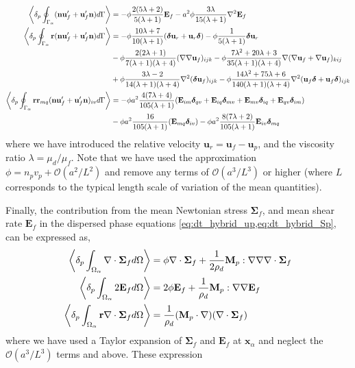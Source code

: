\begin{align}
    \pSavg{ (\textbf{n} \textbf{u}_f' + \textbf{u}_f' \textbf{n})}
    &=
    -  \phi \frac{2(5\lambda +2)}{5(\lambda+1)}\textbf{E}_f
    -  a^2 \phi \frac{3\lambda}{15(\lambda+1)}\grad^2  \textbf{E}_f
    \\
    \pSavg{ \textbf{r}(\textbf{n} \textbf{u}_f' + \textbf{u}_f' \textbf{n})}
    &=
    -\phi \frac{10\lambda +7}{10(\lambda+1)}
    (\bm\delta \textbf{u}_r + \textbf{u}_r \bm\delta)
    - \phi  \frac{1}{5(\lambda+1)}\bm\delta \textbf{u}_r\\
    &-  \phi \frac{2(2\lambda+1)}{7(\lambda+1)(\lambda+4)}(\grad\grad \textbf{u}_f)_{ijk}
    -  \phi \frac{7\lambda^2+20\lambda+3}{35(\lambda+1)(\lambda+4)}\grad(\grad \textbf{u}_f+\grad \textbf{u}_f)_{kij}\nonumber\\
    &+  \phi \frac{3\lambda-2}{14(\lambda+1)(\lambda+4)}\grad^2(\bm\delta\textbf{u}_f)_{ijk}
    -  \phi \frac{14\lambda^2+75\lambda+6}{140(\lambda+1)(\lambda+4)}\grad^2 (\textbf{u}_f \bm\delta + \textbf{u}_f \bm\delta)_{ijk}\nonumber
    \label{eq:secondUN}\\
    \pSavg{ \textbf{rr}_{mq}(\textbf{n} \textbf{u}_f' + \textbf{u}_f' \textbf{n})_{iv}}
    &=
    -\phi a^2 \frac{4(7\lambda+4)}{105(\lambda+1)}
    (\textbf{E}_{im} \bm\delta_{qv}
    +\textbf{E}_{iq}\bm\delta_{mv}
    + \textbf{E}_{mv} \bm\delta_{iq}
    + \textbf{E}_{qv}\bm\delta_{im}
    )
    \\
    &
    -\phi a^2 
    \frac{16}{105(\lambda+1)}(\textbf{E}_{mq}\bm\delta_{iv})
    -\phi a^2 \frac{8(7\lambda+2)}{105(\lambda+1)}\textbf{E}_{iv}\bm\delta_{mq}
    \label{eq:thirsmom}
\end{align}
where we have introduced the relative velocity $\textbf{u}_r = \textbf{u}_f - \textbf{u}_p$, and the viscosity ratio $\lambda = \mu_d/\mu_f$. 
Note that we have used the approximation $\phi=n_pv_p + \mathcal{O}(a^2/L^2)$ and remove any terms of $\mathcal{O}(a^3/L^3)$ or higher (where $L$ corresponds to the typical length  scale of variation of the mean quantities). 

Finally, the contribution from the mean Newtonian stress $\bm\Sigma_f$, and mean shear rate $\textbf{E}_f$ in the dispersed phase equations \eqref{eq:dt_hybrid_up,eq:dt_hybrid_Sp}, can be expressed as\citep{zhang1997momentum,morel2015mathematical}, 
\begin{align}
    \pOavg{\div\bm\Sigma_f} 
    &= \phi\div\bm\Sigma_f  
    +\frac{1}{2\rho_d}\textbf{M}_p:\grad\grad\div\bm\Sigma_f 
    \\
    \pOavg{2\textbf{E}_f} 
    &= 2\phi\textbf{E}_f 
    +
    \frac{1}{\rho_d }\textbf{M}_p :\grad\grad \textbf{E}_f\\
    \pOavg{\textbf{r}\div\bm\Sigma_f} 
    &= 
    \frac{1}{\rho_d}(\textbf{M}_p\cdot
    \grad) (\div\bm\Sigma_f )
    \label{eq:mean_contributions}
\end{align}
where we have used a Taylor expansion of $\bm\Sigma_f$ and $\textbf{E}_f$ at $\textbf{x}_\alpha$ and neglect the $\mathcal{O}(a^3/L^3)$ terms and above. 
These expression 


